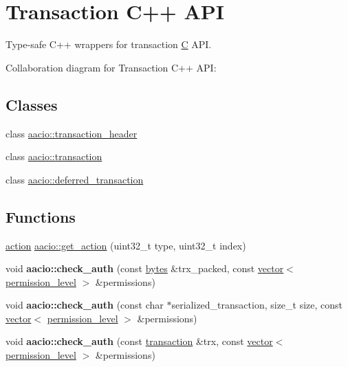 \hypertarget{group__transactioncppapi}{}\section{Transaction C++ A\+PI}
\label{group__transactioncppapi}


Type-\/safe C++ wrappers for transaction \mbox{\hyperlink{struct_c}{C}} A\+PI.  


Collaboration diagram for Transaction C++ A\+PI\+:
\subsection*{Classes}
\begin{DoxyCompactItemize}
\item 
class \mbox{\hyperlink{classaacio_1_1transaction__header}{aacio\+::transaction\+\_\+header}}
\item 
class \mbox{\hyperlink{classaacio_1_1transaction}{aacio\+::transaction}}
\item 
class \mbox{\hyperlink{classaacio_1_1deferred__transaction}{aacio\+::deferred\+\_\+transaction}}
\end{DoxyCompactItemize}
\subsection*{Functions}
\begin{DoxyCompactItemize}
\item 
\mbox{\hyperlink{structaacio_1_1action}{action}} \mbox{\hyperlink{group__transactioncppapi_ga974a97d5931de251ebd3dcf672dfca96}{aacio\+::get\+\_\+action}} (uint32\+\_\+t type, uint32\+\_\+t index)
\item 
\mbox{\label{group__transactioncppapi_ga4a124d3df3cbeb6d780709cde128c7eb}} 
void {\bfseries aacio\+::check\+\_\+auth} (const \mbox{\hyperlink{classstd_1_1vector}{bytes}} \&trx\+\_\+packed, const \mbox{\hyperlink{classstd_1_1vector}{vector}}$<$ \mbox{\hyperlink{structaacio_1_1permission__level}{permission\+\_\+level}} $>$ \&permissions)
\item 
\mbox{\label{group__transactioncppapi_gaac76d1ff36f6ad2e84183b8cab51ec68}} 
void {\bfseries aacio\+::check\+\_\+auth} (const char $\ast$serialized\+\_\+transaction, size\+\_\+t size, const \mbox{\hyperlink{classstd_1_1vector}{vector}}$<$ \mbox{\hyperlink{structaacio_1_1permission__level}{permission\+\_\+level}} $>$ \&permissions)
\item 
\mbox{\label{group__transactioncppapi_gaecb385ea1d08ca6651480933a3d50930}} 
void {\bfseries aacio\+::check\+\_\+auth} (const \mbox{\hyperlink{classaacio_1_1transaction}{transaction}} \&trx, const \mbox{\hyperlink{classstd_1_1vector}{vector}}$<$ \mbox{\hyperlink{structaacio_1_1permission__level}{permission\+\_\+level}} $>$ \&permissions)
\end{DoxyCompactItemize}


